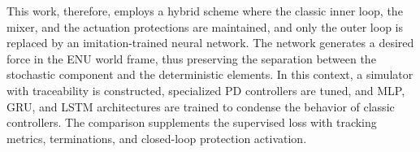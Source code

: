 This work, therefore, employs a hybrid scheme where the classic inner loop, the mixer, and the actuation protections are maintained, and only the outer loop is replaced by an imitation-trained neural network. The network generates a desired force in the ENU world frame, thus preserving the separation between the stochastic component and the deterministic elements. In this context, a simulator with traceability is constructed, specialized PD controllers are tuned, and MLP, GRU, and LSTM architectures are trained to condense the behavior of classic controllers. The comparison supplements the supervised loss with tracking metrics, terminations, and closed-loop protection activation.
